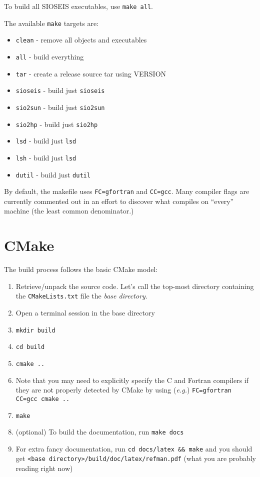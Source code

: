To build all SIOSEIS executables, use \texttt{make all}.

The available \texttt{make} targets are:
\begin{itemize}
\item \texttt{clean}   - remove all objects and executables
\item \texttt{all}     - build everything
\item \texttt{tar}     - create a release source tar using VERSION
\item \texttt{sioseis} - build just \texttt{sioseis}
\item \texttt{sio2sun} - build just \texttt{sio2sun}
\item \texttt{sio2hp}  - build just \texttt{sio2hp}
\item \texttt{lsd}     - build just \texttt{lsd}
\item \texttt{lsh}     - build just \texttt{lsd}
\item \texttt{dutil}   - build just \texttt{dutil}
\end{itemize}

By default, the makefile uses \texttt{FC=gfortran} and \texttt{CC=gcc}.
Many compiler flags are currently commented out in an effort to discover what
compiles on ``every'' machine (the least common denominator.)

\section{CMake}

The build process follows the basic CMake model:
\begin{enumerate}
\item Retrieve/unpack the source code. Let's call the top-most directory containing the \texttt{CMakeLists.txt} file the \textit{base directory}.
\item Open a terminal session in the base directory
\item \texttt{mkdir build}
\item \texttt{cd build}
\item \texttt{cmake ..}
\item Note that you may need to explicitly specify the C and Fortran compilers
      if they are not properly detected by CMake by using (\textit{e.g.})
      \texttt{FC=gfortran CC=gcc cmake ..}
\item \texttt{make}
\item (optional) To build the documentation, run \texttt{make docs}
\item For extra fancy documentation, run \texttt{cd docs/latex \&\& make} and
      you should get \texttt{<base directory>/build/doc/latex/refman.pdf}
      (what you are probably reading right now)
\end{enumerate}

